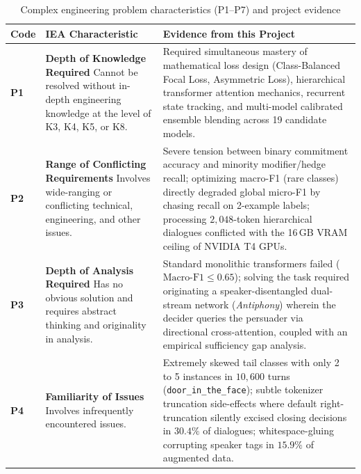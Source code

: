\begin{table}[htbp]
  \centering
  \small
  \caption{Complex engineering problem characteristics (P1--P7) and project evidence}
  \label{tab:complexity}
  \begin{tabularx}{\textwidth}{l>{\hsize}Y>{\hsize}Y}
    \toprule
    \textbf{Code} & \textbf{IEA Characteristic} & \textbf{Evidence from this Project} \\
    \midrule
    \textbf{P1} & \textbf{Depth of Knowledge Required} \newline Cannot be resolved without in-depth engineering knowledge at the level of K3, K4, K5, or K8. & Required simultaneous mastery of mathematical loss design (Class-Balanced Focal Loss, Asymmetric Loss), hierarchical transformer attention mechanics, recurrent state tracking, and multi-model calibrated ensemble blending across 19 candidate models. \\
    \midrule
    \textbf{P2} & \textbf{Range of Conflicting Requirements} \newline Involves wide-ranging or conflicting technical, engineering, and other issues. & Severe tension between binary commitment accuracy and minority modifier/hedge recall; optimizing macro-F1 (rare classes) directly degraded global micro-F1 by chasing recall on 2-example labels; processing $2{,}048$-token hierarchical dialogues conflicted with the 16\,GB VRAM ceiling of NVIDIA T4 GPUs. \\
    \midrule
    \textbf{P3} & \textbf{Depth of Analysis Required} \newline Has no obvious solution and requires abstract thinking and originality in analysis. & Standard monolithic transformers failed ($\text{Macro-F1} \le 0.65$); solving the task required originating a speaker-disentangled dual-stream network (\textit{Antiphony}) wherein the decider queries the persuader via directional cross-attention, coupled with an empirical sufficiency gap analysis. \\
    \midrule
    \textbf{P4} & \textbf{Familiarity of Issues} \newline Involves infrequently encountered issues. & Extremely skewed tail classes with only 2 to 5 instances in $10{,}600$ turns (\texttt{door\_in\_the\_face}); subtle tokenizer truncation side-effects where default right-truncation silently excised closing decisions in $30.4\%$ of dialogues; whitespace-gluing corrupting speaker tags in $15.9\%$ of augmented data. \\

\end{tabularx}
\end{table}
